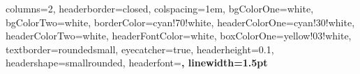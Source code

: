 \documentclass[portrait,a1paper,fontscale=0.42]{baposter}
\begin{document}
\begin{poster}
    {
        columns=2,
        headerborder=closed, %
        colspacing=1em, %
        bgColorOne=white, %
        bgColorTwo=white, %
        borderColor=cyan!70!white, %
        headerColorOne=cyan!30!white, %
        headerColorTwo=white, %
        headerFontColor=white, %
        boxColorOne=yellow!03!white, %
        textborder=roundedsmall, %
        eyecatcher=true, %
        headerheight=0.1\textheight, %
        headershape=smallrounded, %
        headerfont=\Large\bf\textsc, %
        linewidth=1.5pt %
    }
    {
}
\end{poster}
\end{document}
